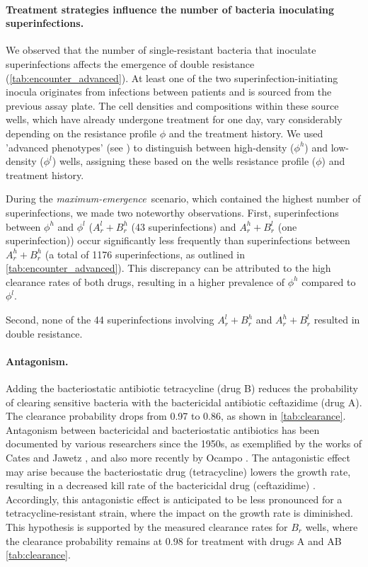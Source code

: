 \paragraph{Treatment strategies influence the number of bacteria inoculating superinfections. \label{ssec:inocula}}
We observed that the number of single-resistant bacteria that inoculate superinfections affects the emergence of double resistance (\autoref{tab:encounter_advanced}).
At least one of the two superinfection-initiating inocula originates from infections between patients and is sourced from the previous assay plate.
The cell densities and compositions within these source wells, which have already undergone treatment for one day, vary considerably depending on the resistance profile $\phi$ and the treatment history.
We used 'advanced phenotypes' (see ) to distinguish between high-density ($\phi^h$) and low-density ($\phi^l$) wells, assigning these based on the wells resistance profile ($\phi$) and treatment history.

During the \textit{maximum-emergence}~scenario, which contained the highest number of superinfections, we made two noteworthy observations.
First, superinfections between $\phi^h$ and $\phi^l$ ($A_r^l + B_r^h$  (43 superinfections) and $A_r^h + B_r^l$ (one superinfection)) occur significantly less frequently than superinfections between $A_r^h + B_r^h$ (a total of 1176 superinfections, as outlined in \autoref{tab:encounter_advanced}). This discrepancy can be attributed to the high clearance rates of both drugs, resulting in a higher prevalence of $\phi^h$ compared to $\phi^l$.

Second, none of the 44 superinfections involving $A_r^l + B_r^h$ and $A_r^h + B_r^l$ resulted in double resistance.

\paragraph{Antagonism.\label{ssec:antagonism}}
Adding the bacteriostatic antibiotic tetracycline (drug B) reduces the probability of clearing sensitive bacteria with the bactericidal antibiotic ceftazidime (drug A). The clearance probability drops from 0.97 to 0.86, as shown in \autoref{tab:clearance}.
Antagonism between bactericidal and bacteriostatic antibiotics has been documented by various researchers since the 1950s, as exemplified by the works of Cates \cite{Cates1951} and Jawetz \cite{Jawetz1957}, and also more recently by Ocampo \cite{Ocampo2014}.
The antagonistic effect may arise because the bacteriostatic drug (tetracycline) lowers the growth rate, resulting in a decreased kill rate of the bactericidal drug (ceftazidime) \cite{Angermayr2022}.
Accordingly, this antagonistic effect is anticipated to be less pronounced for a tetracycline-resistant strain, where the impact on the growth rate is diminished. This hypothesis is supported by the measured clearance rates for $B_r$ wells, where the clearance probability remains at 0.98 for treatment with drugs A and AB \autoref{tab:clearance}.

